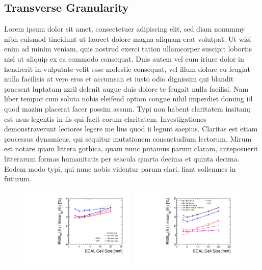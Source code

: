 \documentclass[final,3p,times,twocolumn]{elsarticle}
\begin{document}
\subsection{Transverse Granularity}
Lorem ipsum dolor sit amet, consectetuer adipiscing elit, sed diam nonummy nibh euismod tincidunt ut laoreet dolore magna aliquam erat volutpat. Ut wisi enim ad minim veniam, quis
nostrud exerci tation ullamcorper suscipit lobortis nisl ut aliquip ex ea commodo consequat. Duis autem vel eum iriure dolor in hendrerit in vulputate velit esse molestie consequat,
vel illum dolore eu feugiat nulla facilisis at vero eros et accumsan et iusto odio dignissim qui blandit praesent luptatum zzril delenit augue duis dolore te feugait nulla facilisi.
Nam liber tempor cum soluta nobis eleifend option congue nihil imperdiet doming id quod mazim placerat facer possim assum. Typi non habent claritatem insitam; est usus legentis in
iis qui facit eorum claritatem. Investigationes demonstraverunt lectores legere me lius quod ii legunt saepius. Claritas est etiam processus dynamicus, qui sequitur mutationem
consuetudium lectorum. Mirum est notare quam littera gothica, quam nunc putamus parum claram, anteposuerit litterarum formas humanitatis per seacula quarta decima et quinta
decima. Eodem modo typi, qui nunc nobis videntur parum clari, fiant sollemnes in futurum.

\begin{figure}[!h]
  \begin{center}
     \includegraphics[width=0.49\textwidth]{Res_vs_C_diffE_Photon.pdf}
     \includegraphics[width=0.49\textwidth]{Confusion_vs_C_250.pdf}
     \caption{\label{}}
  \end{center}
\end{figure}
\end{document}
